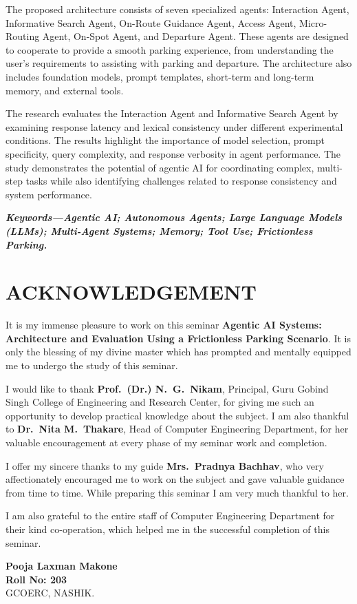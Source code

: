 \documentclass[12pt,a4paper]{report}
\newcommand{\ttitle}{Agentic AI Systems: Architecture and Evaluation Using a Frictionless Parking Scenario}
\newcommand{\studentname}{Pooja Laxman Makone}
\newcommand{\rollno}{203}
\newcommand{\guidename}{Mrs.\ Pradnya Bachhav}
\newcommand{\unnumchapter}[1]{%
  \chapter*{#1}\addcontentsline{toc}{chapter}{#1}}
\begin{document}
The proposed architecture consists of seven specialized agents: Interaction Agent, Informative Search Agent, On-Route Guidance Agent, Access Agent, Micro-Routing Agent, On-Spot Agent, and Departure Agent. These agents are designed to cooperate to provide a smooth parking experience, from understanding the user's requirements to assisting with parking and departure. The architecture also includes foundation models, prompt templates, short-term and long-term memory, and external tools.

The research evaluates the Interaction Agent and Informative Search Agent by examining response latency and lexical consistency under different experimental conditions. The results highlight the importance of model selection, prompt specificity, query complexity, and response verbosity in agent performance. The study demonstrates the potential of agentic AI for coordinating complex, multi-step tasks while also identifying challenges related to response consistency and system performance.

\vspace{6pt}
\noindent\textbf{\emph{Keywords---Agentic AI; Autonomous Agents; Large Language Models (LLMs); Multi-Agent Systems; Memory; Tool Use; Frictionless Parking.}}
\clearpage

\unnumchapter{ACKNOWLEDGEMENT}
It is my immense pleasure to work on this seminar \textbf{\ttitle}. It is only the blessing of my divine master which has prompted and mentally equipped me to undergo the study of this seminar.

I would like to thank \textbf{Prof.\ (Dr.) N.\ G.\ Nikam}, Principal, Guru Gobind Singh College of Engineering and Research Center, for giving me such an opportunity to develop practical knowledge about the subject. I am also thankful to \textbf{Dr.\ Nita M.\ Thakare}, Head of Computer Engineering Department, for her valuable encouragement at every phase of my seminar work and completion.

I offer my sincere thanks to my guide \textbf{\guidename}, who very affectionately encouraged me to work on the subject and gave valuable guidance from time to time. While preparing this seminar I am very much thankful to her.

I am also grateful to the entire staff of Computer Engineering Department for their kind co-operation, which helped me in the successful completion of this seminar.

\vspace{30pt}
\hfill\begin{minipage}{0.45\textwidth}
\singlespacing
\textbf{\studentname}\\
\textbf{Roll No: \rollno}\\[6pt]
GCOERC, NASHIK.
\end{minipage}
\clearpage
\end{document}

